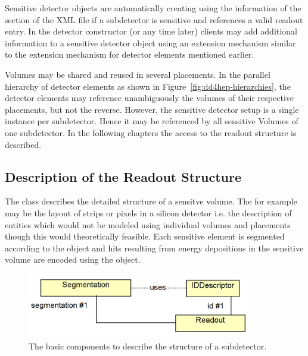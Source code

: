 \documentclass[10pt,a4paper]{article}
\begin{document}
\noindent
Sensitive detector objects are automatically creating using the information
of the  section of the XML file if a subdetector is sensitive
and references a valid readout entry.
In the detector constructor (or any time later) clients 
may add additional information to a sensitive detector object using 
an extension mechanism similar to the extension mechanism for 
detector elements mentioned earlier.


\noindent
Volumes may be shared and reused in several placements. In the parallel
hierarchy of detector elements as shown in Figure~\ref{fig:dd4hep-hierarchies},
the detector elements may reference unambiguously the volumes of their 
respective placements, but not the reverse.
However, the sensitive detector setup is a single instance per subdetector.
Hence it may be referenced by all sensitive Volumes of one subdetector.
In the following chapters the access to the readout structure is described.

\subsection{Description of the Readout Structure}
\label{sec:dd4hep-manual-readout-description}
\noindent
The  class describes the detailed structure of a sensitve volume.
The for example may be the layout of strips or pixels in a silicon detector
i.e. the description of entities which would not be modeled using individual
volumes and placements though this would theoretically  feasible.
Each sensitive element is segmented according to the  object 
and hits resulting from energy depositions in the sensitive volume are 
encoded using the  object.

\begin{figure}[h]
  \begin{center}
    \includegraphics[width=100mm] {DD4hep-readout.png}
    \caption{The basic components to describe the  structure
    of a subdetector. }
    \label{fig:dd4hep-sensitive-detectors}
  \end{center}
  \vspace{-0.6cm}
\end{figure}
\end{document}
